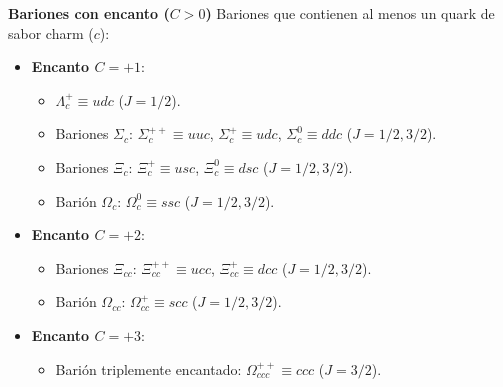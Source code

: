 \textbf{Bariones con encanto ($C > 0$)}
Bariones que contienen al menos un quark de sabor charm ($c$):
\begin{itemize}
    \item \textbf{Encanto $C = +1$}:
    \begin{itemize}
        \item $\Lambda_c^+ \equiv udc$ ($J = 1/2$).
        \item Bariones $\Sigma_c$: $\Sigma_c^{++} \equiv uuc$, $\Sigma_c^+ \equiv udc$, $\Sigma_c^0 \equiv ddc$ ($J = 1/2, 3/2$).
        \item Bariones $\Xi_c$: $\Xi_c^+ \equiv usc$, $\Xi_c^0 \equiv dsc$ ($J = 1/2, 3/2$).
        \item Barión $\Omega_c$: $\Omega_c^0 \equiv ssc$ ($J = 1/2, 3/2$).
    \end{itemize}
    \item \textbf{Encanto $C = +2$}:
    \begin{itemize}
        \item Bariones $\Xi_{cc}$: $\Xi_{cc}^{++} \equiv ucc$, $\Xi_{cc}^+ \equiv dcc$ ($J = 1/2, 3/2$).
        \item Barión $\Omega_{cc}$: $\Omega_{cc}^+ \equiv scc$ ($J = 1/2, 3/2$).
    \end{itemize}
    \item \textbf{Encanto $C = +3$}:
    \begin{itemize}
        \item Barión triplemente encantado: $\Omega_{ccc}^{++} \equiv ccc$ ($J = 3/2$).
    \end{itemize}
\end{itemize}

